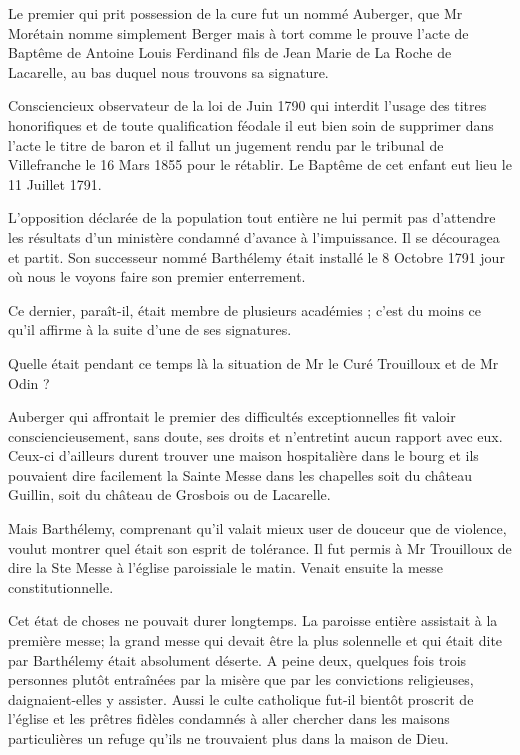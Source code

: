 Le premier qui prit possession de la cure fut un nommé Auberger, que Mr Morétain nomme simplement Berger mais à tort comme le prouve l'acte de Baptême de Antoine Louis Ferdinand fils de Jean Marie de La Roche de Lacarelle, au bas duquel nous trouvons sa signature.

Consciencieux observateur de la loi de Juin 1790 qui interdit l'usage des titres honorifiques et de toute qualification féodale il eut bien soin de supprimer dans l'acte le titre de baron et il fallut un jugement rendu par le tribunal de Villefranche le 16 Mars 1855 pour le rétablir. Le Baptême de cet enfant eut lieu le 11 Juillet 1791.

L'opposition déclarée de la population tout entière ne lui permit pas d'attendre les résultats d'un ministère condamné d'avance à l'impuissance. Il se découragea et partit. Son successeur nommé Barthélemy était installé le 8 Octobre 1791 jour où nous le voyons faire son premier enterrement.

Ce dernier, paraît-il, était membre de plusieurs académies ; c'est du moins ce qu'il affirme à la suite d'une de ses signatures.

Quelle était pendant ce temps là la situation de Mr le Curé Trouilloux et de Mr Odin ?

Auberger qui affrontait le premier des difficultés exceptionnelles fit valoir consciencieusement, sans doute, ses droits et n'entretint
aucun rapport avec eux. Ceux-ci d'ailleurs durent trouver une maison hospitalière dans le bourg et ils pouvaient dire facilement la Sainte Messe dans les chapelles soit du château Guillin, soit du château de Grosbois ou de Lacarelle.

Mais Barthélemy, comprenant qu'il valait mieux user de douceur que de violence, voulut montrer quel était son esprit de tolérance. Il fut permis à Mr Trouilloux de dire la Ste Messe à l'église paroissiale le matin. Venait ensuite la messe constitutionnelle.

Cet état de choses ne pouvait durer longtemps. La paroisse entière assistait à la première messe; la grand messe qui devait être la plus solennelle et qui était dite par Barthélemy était absolument déserte. A peine deux, quelques fois trois personnes plutôt entraînées par la misère que par les convictions religieuses, daignaient-elles y assister. Aussi le culte catholique fut-il bientôt proscrit de l'église et les prêtres fidèles condamnés à aller chercher dans les maisons particulières un refuge qu'ils ne trouvaient plus dans la maison de Dieu.

